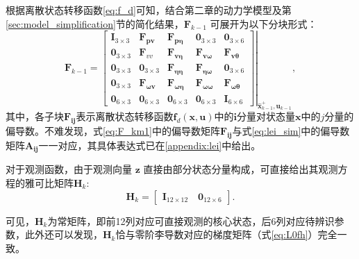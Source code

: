 根据离散状态转移函数\ref{eq:f_d}可知，结合第二章的动力学模型及第\ref{sec:model_simplification}节的简化结果，$\boldsymbol{F}_{k-1}$ 可展开为以下分块形式：
\begin{equation}
    \boldsymbol{F}_{k-1} = 
    \left.\begin{bmatrix}
        \boldsymbol{I}_{3 \times 3} & \boldsymbol{F}_{\boldsymbol{p} \boldsymbol{v}} & \boldsymbol{F}_{\boldsymbol{p} \boldsymbol{\eta}} & \boldsymbol{0}_{3 \times 3} & \boldsymbol{0}_{3 \times 6} \\
        \boldsymbol{0}_{3 \times 3} & \boldsymbol{F}_{v v} & \boldsymbol{F}_{\boldsymbol{v \eta}} & \boldsymbol{F}_{\boldsymbol{v \omega}} & \boldsymbol{F}_{\boldsymbol{v \theta}} \\
        \boldsymbol{0}_{3 \times 3} & \boldsymbol{0}_{3 \times 3} & \boldsymbol{F}_{\boldsymbol{\eta \eta}} & \boldsymbol{F}_{\boldsymbol{\eta \omega}} & \boldsymbol{0}_{3 \times 6} \\
        \boldsymbol{0}_{3 \times 3} & \boldsymbol{F}_{\boldsymbol{\omega v}} & \boldsymbol{F}_{\boldsymbol{\omega \eta}} & \boldsymbol{F}_{\boldsymbol{\omega \omega}} & \boldsymbol{F}_{\boldsymbol{\omega \theta}} \\
        \boldsymbol{0}_{6 \times 3} & \boldsymbol{0}_{6 \times 3} & \boldsymbol{0}_{6 \times 3} & \boldsymbol{0}_{6 \times 3} & \boldsymbol{I}_{6 \times 6}
    \end{bmatrix}\right|_{\hat{\boldsymbol{x}}_{k-1}^+, \boldsymbol{u}_{k-1}},
    \label{eq:F_km1}
\end{equation}
其中，各子块$\boldsymbol{F}_{\boldsymbol{ij}}$表示离散状态转移函数$\boldsymbol{f}_d(\boldsymbol{x},\boldsymbol{u})$中的$\boldsymbol{i}$分量对状态量$\boldsymbol{x}$中的$j$分量的偏导数。不难发现，式\eqref{eq:F_km1}中的偏导数矩阵$\boldsymbol{F}_{\boldsymbol{ij}}$与式\eqref{eq:lei_sim}中的偏导数矩阵$\boldsymbol{A}_{\boldsymbol{ij}}$一一对应，其具体表达式已在\ref{appendix:lei}中给出。

对于观测函数，由于观测向量 $\boldsymbol{z}$ 直接由部分状态分量构成，可直接给出其观测方程的雅可比矩阵$\boldsymbol{H}_k$:
\begin{equation}
    \boldsymbol{H}_k = 
    \begin{bmatrix}
        \boldsymbol{I}_{12 \times 12} \quad \boldsymbol{0}_{12 \times 6}
    \end{bmatrix}.
    \label{eq:H_k}
\end{equation}

可见，$\boldsymbol{H}_k$为常矩阵，即前12列对应可直接观测的核心状态，后6列对应待辨识参数，此外还可以发现，$\boldsymbol{H}_k$恰与零阶李导数对应的梯度矩阵（式\eqref{eq:L0fh}）完全一致。

